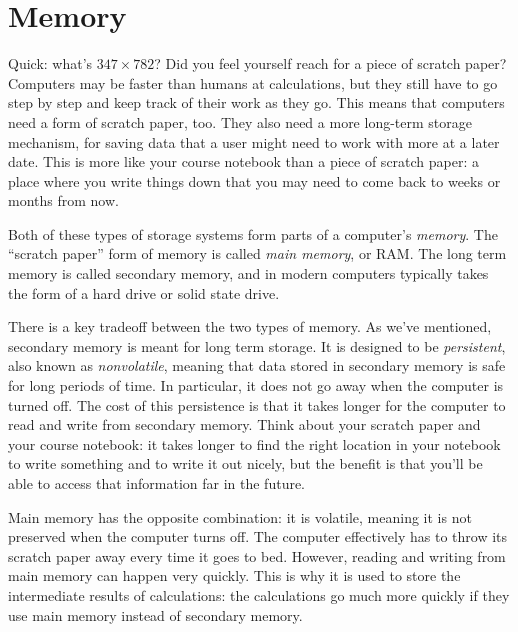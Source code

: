 \section{Memory}

Quick: what's $347 \times 782$? Did you feel yourself reach for a piece of scratch paper? Computers may be faster than humans at calculations, but they still have to go step by step and keep track of their work as they go. This means that computers need a form of scratch paper, too. They also need a more long-term storage mechanism, for saving data that a user might need to work with more at a later date. This is more like your course notebook than a piece of scratch paper: a place where you write things down that you may need to come back to weeks or months from now.

Both of these types of storage systems form parts of a computer's \emph{memory}. The ``scratch paper'' form of memory is called \emph{main memory}, or RAM. The long term memory is called secondary memory, and in modern computers typically takes the form of a hard drive or solid state drive.

There is a key tradeoff between the two types of memory. As we've mentioned, secondary memory is meant for long term storage. It is designed to be \emph{persistent}, also known as \emph{nonvolatile}, meaning that data stored in secondary memory is safe for long periods of time. In particular, it does not go away when the computer is turned off. The cost of this persistence is that it takes longer for the computer to read and write from secondary memory. Think about your scratch paper and your course notebook: it takes longer to find the right location in your notebook to write something and to write it out nicely, but the benefit is that you'll be able to access that information far in the future.

Main memory has the opposite combination: it is volatile, meaning it is not preserved when the computer turns off. The computer effectively has to throw its scratch paper away every time it goes to bed. However, reading and writing from main memory can happen very quickly. This is why it is used to store the intermediate results of calculations: the calculations go much more quickly if they use main memory instead of secondary memory.

